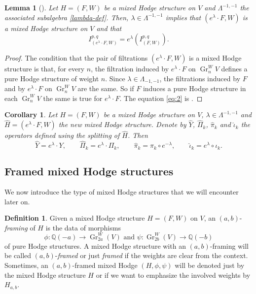 \documentclass[11pt,a4paper]{amsart}
\newcommand{\Q}{\mathds{Q}}
\DeclareMathOperator {\Gr} {Gr}
\numberwithin{equation}{section}
\theoremstyle{plain}
\newtheorem{cor}[prop]{Corollary}
\newtheorem{lem}[prop]{Lemma}
\theoremstyle{definition}
\newtheorem{df}[prop]{Definition}
\begin{document}
\begin{lem}[{\cite[Lemma 4.11]{Pearlstein:vmhshf}}]
  \label{lambda-equiv} Let $H=(F,W)$ be a 
  mixed Hodge structure on $V$ and $\Lambda^{-1,-1}$ the associated
  subalgebra 
  \eqref{lambda-def}.  Then, $\lambda\in\Lambda^{-1,-1}$ implies that
   $(e^{\lambda}\cdot F,W)$ is a mixed Hodge structure on $V$ and that
   \begin{equation} \label{eq:2}
     I^{p,q}_{(e^{\lambda}\cdot F,W)} = e^{\lambda}(I^{p,q}_{(F,W)}).
   \end{equation}
 \end{lem}
 \begin{proof}
   The condition that the pair of filtrations $(e^{\lambda }\cdot F, W)$
   is a mixed Hodge structure is that, for every $n$, the filtration induced by
   $e^{\lambda }\cdot F$ on $\Gr_{n}^{W}V$ defines a pure Hodge structure of
   weight $n$. Since $\lambda \in \Lambda _{-1,-1}$, the filtrations
   induced by $F$ and by $e^{\lambda }\cdot F$ on $\Gr_{n}^{W}V$ are the
   same. So if $F$ 
   induces a pure Hodge structure in each $\Gr_{n}^{W}V$ the same is
   true for $e^{\lambda }\cdot F$. The equation \eqref{eq:2} is
   \cite[Lemma 4.11]{Pearlstein:vmhshf}.
 \end{proof}

 \begin{cor}\label{cor:2}
   Let $H=(F,W)$ be a  mixed Hodge structure on $V$, $\lambda \in
   \Lambda^{-1,-1}$ and $\hat H=(e^{\lambda }\cdot F,W)$ the new mixed
   Hodge structure. Denote by $\hat Y$, $\hat \Pi _{k}$, $\hat \pi
   _{k}$ and $\hat \iota_{k}$ the operators defined using the
   splitting of $\hat H$. Then
   \begin{displaymath}
     \hat Y = e^{\lambda }\cdot Y,\qquad
     \hat \Pi _{k} = e^{\lambda }\cdot \Pi _{k},\qquad
     \hat \pi _{k} = \pi _{k}\circ e^{-\lambda },\qquad
     \hat \iota _{k} = e^{\lambda }\circ \iota _{k}.
   \end{displaymath}
 \end{cor}

 \subsection{Framed mixed Hodge structures}
\label{sec:framed-mixed-hodge}
We now introduce the type of mixed Hodge structures that we will encounter later on. 

\begin{df}\label{framed-mhs}
Given a mixed Hodge structure $H=(F,W)$ on $V$, an $(a,b)$-\textit{framing} of
$H$ is the data of morphisms
\begin{displaymath}
  \phi\colon
  \Q(-a)\rightarrow \Gr^{W}_{2a}(V)\text{ and }
  \psi\colon \Gr^{W}_{2b}(V)\rightarrow \Q(-b)
\end{displaymath}
of pure Hodge structures.
A mixed Hodge structure with an $(a,b)$-framing will be called
$(a,b)$-\emph{framed} or just \emph{framed} if the weights are clear from the
context.  Sometimes, an $(a,b)$-framed mixed Hodge $(H,\phi ,\psi )$ will be
denoted just by the mixed Hodge structure $H$ or if we want to
emphasize the involved weights by $H_{a,b}$.
\end{df}
\end{document}
